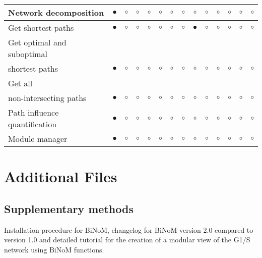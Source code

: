 \documentclass[10pt]{bmc_article}
\newenvironment{bmcformat}{\baselineskip20pt\sloppy\setboolean{publ}{false}}{\baselineskip20pt\sloppy}
\begin{document}
\begin{bmcformat}
\begin{center}
{{\begin{tabular}{|l|c|c|c|c|c|c|c|c|c|c|c|c|c|}
        Network decomposition & $\bullet$      &$\circ$&$\circ$& $\circ$      & $\circ$       & $\circ$           & $\circ$     & $\circ$               &  $\circ$      &  $\circ$       &  $\circ$           & $\circ$            &  $\circ$      \\ \hline
        Get shortest paths    & $\bullet$      &$\circ$&$\circ$& $\circ$      & $\circ$       & $\circ$           & $\circ$     & $\bullet$               &  $\circ$      &  $\circ$       &  $\circ$           & $\circ$            &  $\circ$      \\ \hline
        Get optimal and suboptimal & & & & & & & & & & & & &
          \\shortest paths    & $\bullet$      &$\circ$&$\circ$& $\circ$      & $\circ$       & $\circ$           & $\circ$     & $\circ$               &  $\circ$      &  $\circ$       &  $\circ$           & $\circ$            &  $\circ$      \\ \hline
        Get all  & & & & & & & & & & & & &
          \\non-intersecting paths    & $\bullet$      &$\circ$&$\circ$& $\circ$      & $\circ$       & $\circ$           & $\circ$     & $\circ$               &  $\circ$      &  $\circ$       &  $\circ$           & $\circ$            &  $\circ$      \\ \hline
        Path influence quantification & $\bullet$      &$\circ$&$\circ$& $\circ$      & $\circ$       & $\circ$           & $\circ$     & $\circ$               &  $\circ$      &  $\circ$       &  $\circ$           & $\circ$            &  $\circ$      \\ \hline
        Module manager       & $\bullet$      &$\circ$&$\circ$& $\circ$      & $\circ$       & $\circ$           & $\circ$     & $\circ$               &  $\circ$      &  $\circ$       &  $\circ$           & $\circ$            &  $\circ$      \\ \hline

\hline
      \end{tabular}
      }}
\end{center}


\section*{Additional Files}
  \subsection*{Supplementary methods}
	Installation procedure for BiNoM, changelog for BiNoM version 2.0 compared to version 1.0 and detailed tutorial for the creation of a modular view of the G1/S network using BiNoM functions.

\end{bmcformat}
\end{document}
